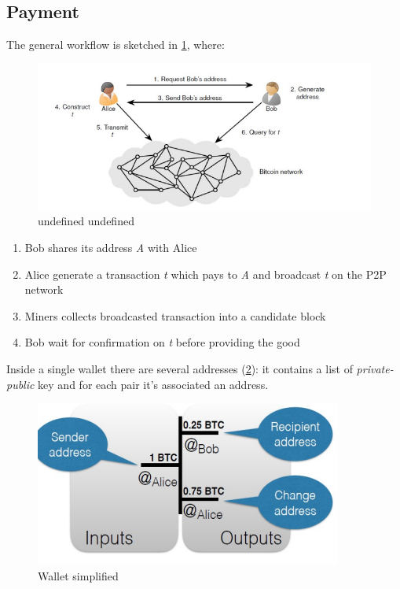 \documentclass[10pt,a4paper]{report}
\begin{document}
\subsection{Payment}\label{sec:payment}
The general workflow is sketched in \ref{payment-workflow}, where:
\begin{figure}[h]
	\centering
	\includegraphics[scale=0.50]{images/Pasted image 20230329120000.png}
	\caption{undefined undefined}
	\label{payment-workflow}
\end{figure}

\begin{enumerate}
	\item 
	Bob shares its address \textit{A} with Alice
	\item 
	Alice generate a transaction  \textit{t} which pays to \textit{A} and broadcast \textit{t} on the P2P network
	\item 
	Miners collects broadcasted transaction into a candidate block
	\item 
	Bob wait for confirmation on \textit{t} before providing the good
\end{enumerate}

Inside a single wallet there are several addresses (\ref{wallet-simplified}): it contains a list of \textit{private-public} key and for each pair it's associated an address.
\begin{figure}[h]
	\centering
	\includegraphics[scale=0.50]{images/Pasted image 20230329120356.png}
	\caption{Wallet simplified}
	\label{wallet-simplified}
\end{figure}
\end{document}
